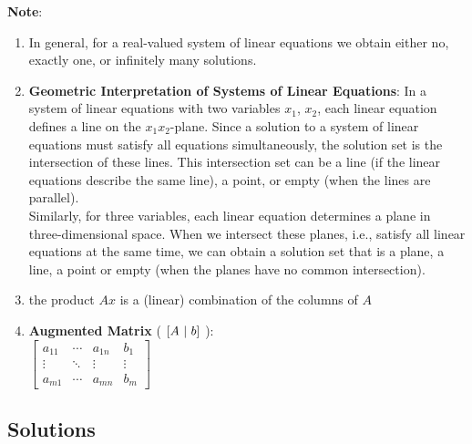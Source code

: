 \begin{enumerate}
    
    
\end{enumerate}


\vspace{0.5cm}
\textbf{Note}:
\begin{enumerate}
    \item In general, for a real-valued system of linear equations we obtain either no, exactly one, or infinitely many solutions. 
    \hfill \cite{mfml/book/mml/Deisenroth-Faisal-Ong}

    \item \textbf{Geometric Interpretation of Systems of Linear Equations}: 
    In a system of linear equations with two variables $x_1$, $x_2$, each linear equation defines a line on the $x_1x_2$-plane. Since a solution to a system of linear equations must satisfy all equations simultaneously, the solution set is the intersection of these lines. This intersection set can be a line (if the linear equations describe the same line), a point, or empty (when the lines are parallel).
    \hfill \cite{mfml/book/mml/Deisenroth-Faisal-Ong}
    \\
    Similarly, for three variables, each linear equation determines a plane in three-dimensional space. When we intersect these planes, i.e., satisfy all linear equations at the same time, we can obtain a solution set that is a plane, a line, a point or empty (when the planes have no common intersection).
    \hfill \cite{mfml/book/mml/Deisenroth-Faisal-Ong}

    \item the product $Ax$ is a (linear) combination of the columns of $A$
    \hfill \cite{mfml/book/mml/Deisenroth-Faisal-Ong}

    \item \textbf{Augmented Matrix} ( $\left[A\ |\ b\right]$ ): 
    \\[0.2cm]
    $
        \left[
        \begin{array}{ccc|c}
            a_{11} & \cdots & a_{1n} & b_{1}\\
            \vdots & \ddots & \vdots & \vdots \\
            a_{m1} & \cdots & a_{mn} & b_{m}
        \end{array}
        \right]
    $
\end{enumerate}








\subsection{Solutions}

